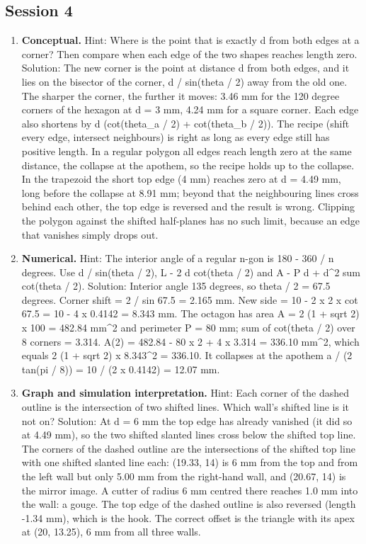 \documentclass[11pt,a4paper]{article}
\begin{document}
\subsection*{Session 4}
\begin{enumerate}[nosep]
\item \textbf{Conceptual.} Hint: Where is the point that is exactly d from both edges at a corner? Then compare when each edge of the two shapes reaches length zero. Solution: The new corner is the point at distance d from both edges, and it lies on the bisector of the corner, d / sin(theta / 2) away from the old one. The sharper the corner, the further it moves: 3.46 mm for the 120 degree corners of the hexagon at d = 3 mm, 4.24 mm for a square corner. Each edge also shortens by d (cot(theta\_a / 2) + cot(theta\_b / 2)). The recipe (shift every edge, intersect neighbours) is right as long as every edge still has positive length. In a regular polygon all edges reach length zero at the same distance, the collapse at the apothem, so the recipe holds up to the collapse. In the trapezoid the short top edge (4 mm) reaches zero at d = 4.49 mm, long before the collapse at 8.91 mm; beyond that the neighbouring lines cross behind each other, the top edge is reversed and the result is wrong. Clipping the polygon against the shifted half-planes has no such limit, because an edge that vanishes simply drops out.
\item \textbf{Numerical.} Hint: The interior angle of a regular n-gon is 180 - 360 / n degrees. Use d / sin(theta / 2), L - 2 d cot(theta / 2) and A - P d + d\textasciicircum{}2 sum cot(theta / 2). Solution: Interior angle 135 degrees, so theta / 2 = 67.5 degrees. Corner shift = 2 / sin 67.5 = 2.165 mm. New side = 10 - 2 x 2 x cot 67.5 = 10 - 4 x 0.4142 = 8.343 mm. The octagon has area A = 2 (1 + sqrt 2) x 100 = 482.84 mm\textasciicircum{}2 and perimeter P = 80 mm; sum of cot(theta / 2) over 8 corners = 3.314. A(2) = 482.84 - 80 x 2 + 4 x 3.314 = 336.10 mm\textasciicircum{}2, which equals 2 (1 + sqrt 2) x 8.343\textasciicircum{}2 = 336.10. It collapses at the apothem a / (2 tan(pi / 8)) = 10 / (2 x 0.4142) = 12.07 mm.
\item \textbf{Graph and simulation interpretation.} Hint: Each corner of the dashed outline is the intersection of two shifted lines. Which wall's shifted line is it not on? Solution: At d = 6 mm the top edge has already vanished (it did so at 4.49 mm), so the two shifted slanted lines cross below the shifted top line. The corners of the dashed outline are the intersections of the shifted top line with one shifted slanted line each: (19.33, 14) is 6 mm from the top and from the left wall but only 5.00 mm from the right-hand wall, and (20.67, 14) is the mirror image. A cutter of radius 6 mm centred there reaches 1.0 mm into the wall: a gouge. The top edge of the dashed outline is also reversed (length -1.34 mm), which is the hook. The correct offset is the triangle with its apex at (20, 13.25), 6 mm from all three walls.

\end{enumerate}
\end{document}
